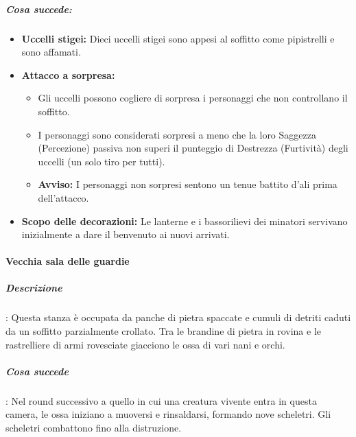 \documentclass{article}
\begin{document}
\subparagraph{Cosa succede:}
\begin{itemize}
    \item \textbf{Uccelli stigei:} Dieci uccelli stigei sono appesi al soffitto come pipistrelli e sono affamati.
    \item \textbf{Attacco a sorpresa:}
    \begin{itemize}
        \item Gli uccelli possono cogliere di sorpresa i personaggi che non controllano il soffitto.
        \item I personaggi sono considerati sorpresi a meno che la loro Saggezza (Percezione) passiva non superi il punteggio di Destrezza (Furtività) degli uccelli (un solo tiro per tutti).
        \item \textbf{Avviso:} I personaggi non sorpresi sentono un tenue battito d'ali prima dell'attacco.
    \end{itemize}
    \item \textbf{Scopo delle decorazioni:} Le lanterne e i bassorilievi dei minatori servivano inizialmente a dare il benvenuto ai nuovi arrivati.
\end{itemize}

 \paragraph{Vecchia sala delle guardie}

\subparagraph{Descrizione} : 
    Questa stanza è occupata da panche di pietra spaccate e cumuli di detriti caduti da un soffitto parzialmente crollato. Tra le brandine di pietra in rovina e le rastrelliere di armi rovesciate giacciono le ossa di vari nani e orchi. 


\subparagraph{Cosa succede}: Nel round successivo a quello in cui una creatura vivente entra in questa camera, le ossa iniziano a muoversi e rinsaldarsi, formando nove scheletri. Gli scheletri combattono fino alla distruzione.
\end{document}
